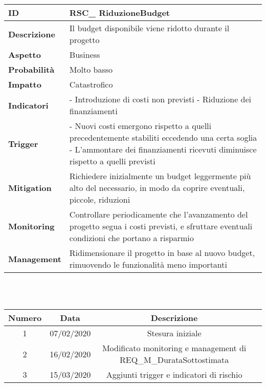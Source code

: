 \begin{tabular}{|p{2.2cm}|p{9.6cm}| }
 	\hline
	\textbf{ID} & RSC\_ RiduzioneBudget\\ [0.5ex] 
	\hline
	\textbf{Descrizione} & Il budget disponibile viene ridotto durante il progetto\\ 
	\hline
	\textbf{Aspetto} &  Business\\
	\hline
	\textbf{Probabilità} & Molto basso\\ 
	\hline
	\textbf{Impatto} & Catastrofico\\
	\hline
	\textbf{Indicatori} & - Introduzione di costi non previsti \newline
						  - Riduzione dei finanziamenti\\
	\hline
	\textbf{Trigger} & - Nuovi costi emergono rispetto a quelli precedentemente stabiliti eccedendo una certa soglia\newline
					   - L'ammontare dei finanziamenti ricevuti diminuisce rispetto a quelli previsti\\
	\hline
	\textbf{Mitigation} & Richiedere inizialmente un budget leggermente più alto del necessario, in modo da coprire eventuali, piccole, riduzioni\\
	\hline
	\textbf{Monitoring} & Controllare periodicamente che l'avanzamento del progetto segua i costi previsti, e sfruttare eventuali condizioni che portano a risparmio\\ 
	\hline
	\textbf{Management} & Ridimensionare il progetto in base al nuovo budget, rimuovendo le funzionalità meno importanti\\ 
	\hline
\end{tabular}

\renewcommand\theadfont{}

\newpage
{} \\ \\
\begin{tabular}{|c | c | c | c|} 
 	\hline
	 Numero & Data & Descrizione \\ [0.5ex] 
	\hline\hline
	1 & 07/02/2020 & Stesura iniziale \\ 
	\hline
	2 & 16/02/2020 & Modificato monitoring e management di REQ\_M\_DurataSottostimata \\
	\hline
	3 & 15/03/2020 & Aggiunti trigger e indicatori di rischio \\
	\hline
\end{tabular}
